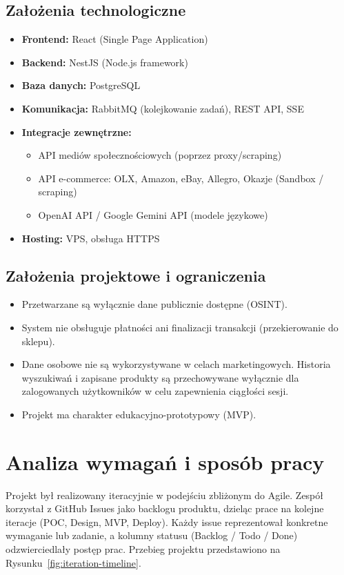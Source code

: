 \documentclass[12pt,a4paper]{article}
\begin{document}
\subsection{Założenia technologiczne}
\begin{itemize}
    \item \textbf{Frontend:} React (Single Page Application)
    \item \textbf{Backend:} NestJS (Node.js framework)
    \item \textbf{Baza danych:} PostgreSQL
    \item \textbf{Komunikacja:} RabbitMQ (kolejkowanie zadań), REST API, SSE
    \item \textbf{Integracje zewnętrzne:}
    \begin{itemize}
        \item API mediów społecznościowych (poprzez proxy/scraping)
        \item API e-commerce: OLX, Amazon, eBay, Allegro, Okazje (Sandbox / scraping)
        \item OpenAI API / Google Gemini API (modele językowe)
    \end{itemize}
    \item \textbf{Hosting:} VPS, obsługa HTTPS
\end{itemize}

\subsection{Założenia projektowe i ograniczenia}
\begin{itemize}
    \item Przetwarzane są wyłącznie dane publicznie dostępne (OSINT).
    \item System nie obsługuje płatności ani finalizacji transakcji (przekierowanie do sklepu).
    \item Dane osobowe nie są wykorzystywane w celach marketingowych. Historia wyszukiwań i zapisane produkty są przechowywane wyłącznie dla zalogowanych użytkowników w celu zapewnienia ciągłości sesji.
    \item Projekt ma charakter edukacyjno-prototypowy (MVP).
\end{itemize}

\section{Analiza wymagań i sposób pracy}

Projekt był realizowany iteracyjnie w podejściu zbliżonym do Agile. Zespół korzystał z GitHub Issues jako backlogu produktu, dzieląc prace na kolejne iteracje (POC, Design, MVP, Deploy). Każdy issue reprezentował konkretne wymaganie lub zadanie, a kolumny statusu (Backlog / Todo / Done) odzwierciedlały postęp prac. Przebieg projektu przedstawiono na Rysunku~\ref{fig:iteration-timeline}.
\end{document}
